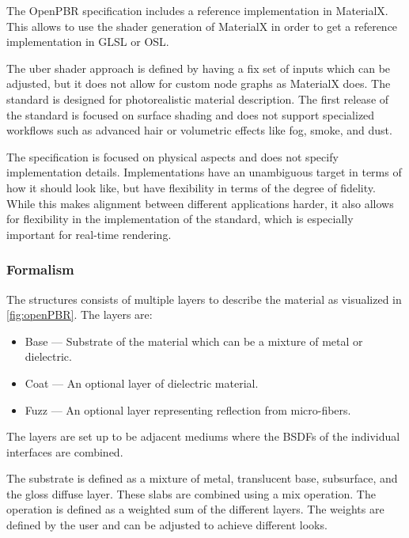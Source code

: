 The \gls{OpenPBR} specification includes a reference implementation in \gls{MaterialX}. This allows to use the shader generation of \gls{MaterialX} in order to get a reference implementation in \gls{GLSL} or \gls{OSL}.

The \gls{uber shader} approach is defined by having a fix set of inputs which can be adjusted, but it does not allow for custom node graphs as \gls{MaterialX} does. The standard is designed for photorealistic material description. The first release of the standard is focused on surface shading and does not support specialized workflows such as advanced hair or volumetric effects like fog, smoke, and dust.

The specification is focused on physical aspects and does not specify implementation details. Implementations have an unambiguous target in terms of how it should look like, but have flexibility in terms of the degree of fidelity. While this makes alignment between different applications harder, it also allows for flexibility in the implementation of the standard, which is especially important for real-time rendering.

\subsubsection{Formalism}

The structures consists of multiple layers to describe the material as visualized in \autoref{fig:openPBR}. The layers are:

\begin{itemize}
  \item{Base} — Substrate of the material which can be a mixture of metal or dielectric.
  \item{Coat} — An optional layer of dielectric material.
  \item{Fuzz} — An optional layer representing reflection from micro-fibers.
\end{itemize}

The layers are set up to be adjacent mediums where the \glspl{BSDF} of the individual interfaces are combined.

The substrate is defined as a mixture of metal, translucent base, subsurface, and the gloss diffuse layer. These slabs are combined using a mix operation. The operation is defined as a weighted sum of the different layers. The weights are defined by the user and can be adjusted to achieve different looks.

